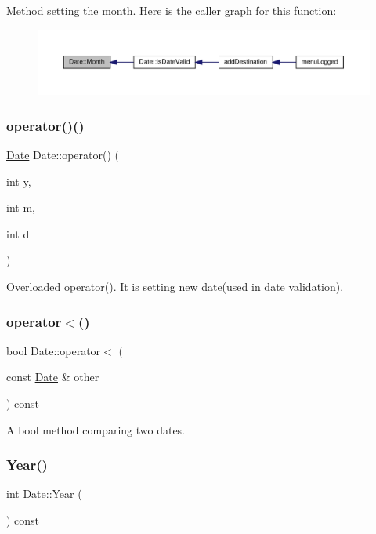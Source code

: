 Method setting the month. Here is the caller graph for this function\+:\nopagebreak
\begin{figure}[H]
\begin{center}
\leavevmode
\includegraphics[width=350pt]{class_date_a1c1871e2d6adcb08fd30ffae440b3803_icgraph}
\end{center}
\end{figure}
\mbox{\label{class_date_a425bd02efac05e6b65a8b7456317822f}} 
\subsubsection{\texorpdfstring{operator()()}{operator()()}}
{\footnotesize\ttfamily \hyperlink{class_date}{Date} Date\+::operator() (\begin{DoxyParamCaption}\item[{int}]{y,  }\item[{int}]{m,  }\item[{int}]{d }\end{DoxyParamCaption})}

Overloaded operator(). It is setting new date(used in date validation). \mbox{\label{class_date_a08c0538091d061550b90787d9313ca61}} 
\subsubsection{\texorpdfstring{operator$<$()}{operator<()}}
{\footnotesize\ttfamily bool Date\+::operator$<$ (\begin{DoxyParamCaption}\item[{const \hyperlink{class_date}{Date} \&}]{other }\end{DoxyParamCaption}) const}

A bool method comparing two dates. \mbox{\label{class_date_a284f8985596b83ad9388b464eb6b54bd}} 
\subsubsection{\texorpdfstring{Year()}{Year()}}
{\footnotesize\ttfamily int Date\+::\+Year (\begin{DoxyParamCaption}{ }\end{DoxyParamCaption}) const}

